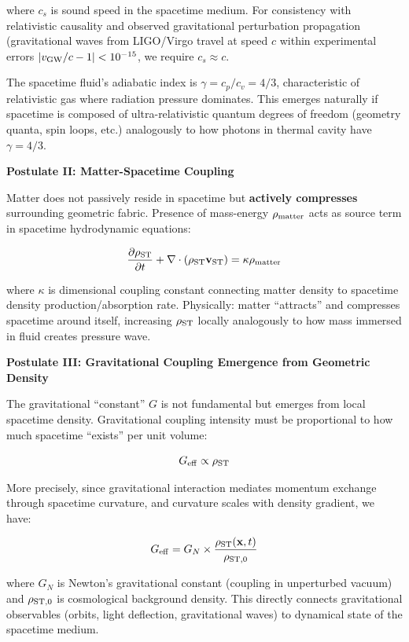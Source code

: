 \documentclass[11pt,a4paper]{article}
\begin{document}
where \(c_s\) is sound speed in the spacetime medium. For consistency
with relativistic causality and observed gravitational perturbation
propagation (gravitational waves from LIGO/Virgo travel at speed \(c\)
within experimental errors \(|v_{\rm GW}/c - 1| < 10^{-15}\), we
require \(c_s \approx c\).

The spacetime fluid's adiabatic index is \(\gamma = c_p/c_v = 4/3\),
characteristic of relativistic gas where radiation pressure dominates.
This emerges naturally if spacetime is composed of ultra-relativistic
quantum degrees of freedom (geometry quanta, spin loops, etc.)
analogously to how photons in thermal cavity have \(\gamma = 4/3\).

\textbf{Postulate II: Matter-Spacetime Coupling}

Matter does not passively reside in spacetime but \textbf{actively
compresses} surrounding geometric fabric. Presence of mass-energy
\(\rho_{\rm matter}\) acts as source term in spacetime hydrodynamic
equations:

\[\frac{\partial \rho_{\rm ST}}{\partial t} + \nabla \cdot (\rho_{\rm ST} {\bf v}_{\rm ST}) = \kappa \rho_{\rm matter}\]

where \(\kappa\) is dimensional coupling constant connecting matter
density to spacetime density production/absorption rate. Physically:
matter ``attracts'' and compresses spacetime around itself, increasing
\(\rho_{\rm ST}\) locally analogously to how mass immersed in fluid
creates pressure wave.

\textbf{Postulate III: Gravitational Coupling Emergence from Geometric
Density}

The gravitational ``constant'' \(G\) is not fundamental but emerges from
local spacetime density. Gravitational coupling intensity must be
proportional to how much spacetime ``exists'' per unit volume:

\[G_{\rm eff} \propto \rho_{\rm ST}\]

More precisely, since gravitational interaction mediates momentum
exchange through spacetime curvature, and curvature scales with density
gradient, we have:

\[G_{\rm eff} = G_N \times \frac{\rho_{\rm ST}({\bf x},t)}{\rho_{\rm ST,0}}\]

where \(G_N\) is Newton's gravitational constant (coupling in
unperturbed vacuum) and \(\rho_{\rm ST,0}\) is cosmological background
density. This directly connects gravitational observables (orbits, light
deflection, gravitational waves) to dynamical state of the spacetime
medium.
\end{document}
